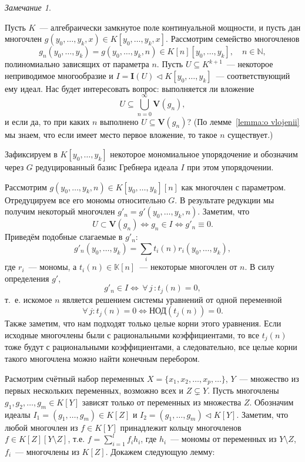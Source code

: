 \documentclass[16pt]{article}
\theoremstyle{plain1}
\theoremstyle{plain2}
\theoremstyle{plain}
\theoremstyle{plain3}
\theoremstyle{definition}
\theoremstyle{remark}
\newtheorem{remark}[theorem1]{Замечание}
\begin{document}
\bigskip

\begin{remark}\label{remark:o vlojenii}

Пусть $K$~--- алгебраически замкнутое поле континуальной
мощности, и пусть дан многочлен $ g(y_0,\ldots,y_k,x)\in
K[y_0,\ldots,y_k,x]$. Рассмотрим семейство многочленов
$$
g_n(y_0,\ldots,y_k) = g(y_0,\ldots,y_k,n) \in K[n][y_0,\ldots,y_k],\quad
n\in \mathbb N,
$$
полиномиально зависящих от параметра $n$.
Пусть $U\subseteq K^{k+1}$~--- некоторое неприводимое многообразие и
$I=\mathbf{I}(U)\triangleleft K[y_0,\ldots,y_k]$~---
соответствующий ему идеал.
Нас будет интересовать вопрос: выполняется ли вложение
$$
U\subseteq \bigcup_{n=0}^{\infty}\mathbf{V}(g_n),
$$
и если да, то при каких $n$ выполнено $U\subseteq \mathbf{V}(g_n)$?
(По лемме~\ref{lemma:o vlojenii} мы знаем, что если имеет место первое вложение, то такое $n$ существует.)

Зафиксируем в $K[y_0,\ldots,y_k]$ некоторое
мономиальное упорядочение и обозначим через $G$ редуцированный базис
Гребнера идеала $I$ при этом упорядочении.

Рассмотрим $g(y_0,\ldots,y_k,n)\in K[y_0,\ldots,y_k][n]$ как многочлен с параметром. Отредуцируем все его мономы относительно $G$. В результате редукции мы получим некоторый многочлен $g'_n = g'(y_0,\ldots,y_k,n)$. Заметим, что
$$
{U} \subset \mathbf{V}(g_n)
\Leftrightarrow g_n\in I\Leftrightarrow
g'_n\equiv0.
$$
Приведём подобные слагаемые в $g'_n$:
$$
g'_n(y_0,\ldots, y_k)=\sum_i\limits t_i(n)r_i(y_0,\ldots, y_k),
$$
где $r_i$~--- мономы, а $t_i(n)\in\mathbb{K}[n]$~--- некоторые многочлен от $n$.
В силу определения $g'$,
$$
g'_n\in I\Leftrightarrow\, \forall\, j\,: t_j(n)=0,
$$
т.~е. искомое $n$ является решением системы уравнений от
одной переменной
$$
\forall\, j:t_j(n)=0\Leftrightarrow \text{НОД}(t_j(n))=0.
$$
Также заметим, что нам подходят только целые корни этого уравнения. Если исходные
многочлены были с рациональными коэффициентами, то все $t_j(n)$
тоже будут с рациональными коэффициентами, а следовательно,
все целые корни такого многочлена можно найти конечным перебором.
\end{remark}


Расмотрим счётный набор переменных $X=\{x_1,x_2,\ldots,x_p,\ldots\}$, $Y$~--- множество из первых нескольких переменных, возможно всех и $Z\subsetneq Y$. Пусть многочлены $g_1, g_2,\ldots, g_m\in K[Y]$ зависят только от переменных из множества $Z$. Обозначим идеалы $I_1=(g_1,\ldots, g_m)\in K[Z]$ и  $I_2=(g_1,\ldots, g_m)\triangleleft K[Y]$. Заметим, что любой многочлен из  $f\in K[Y]$ принадлежит  кольцу многочленов $f\in K[Z][Y\setminus Z]$, т.е. $f=\sum\limits_{i=1}^lf_ih_i$, где $h_i$~--- мономы от переменных из $Y\setminus Z$, $f_i$~--- многочлены из $K[Z]$. Докажем следующую лемму:
\end{document}
